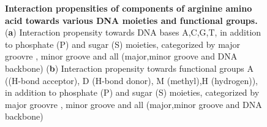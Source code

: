 \par
\begin{center}
    \begin{figure}
        \caption[Interaction propensities of components of arginine amino acid towards various DNA moieties and functional groups]{\textbf{ Interaction propensities of components of arginine amino acid towards various DNA moieties and functional groups.} ({\bf a}) Interaction  propensity towards DNA bases 	A,C,G,T, in addition to phosphate (P) and sugar (S) moieties, categorized by major groovre , minor groove and all (major,minor groove and DNA backbone) ({\bf b}) Interaction  propensity towards functional groups \citep{Chiu2023} A ((H-bond acceptor), D (H-bond donor), M (methyl),H (hydrogen)), in addition to phosphate (P) and sugar (S) moieties, categorized by major groovre , minor groove and all (major,minor groove and DNA backbone)}
  \label{fig:arg}
\end{figure}
\end{center}